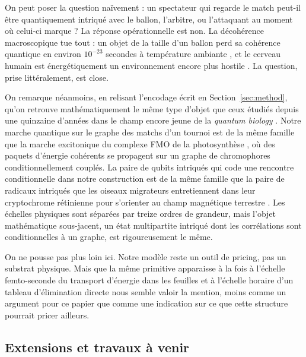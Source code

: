 \documentclass[11pt]{article}
\begin{document}
On peut poser la question naïvement : un spectateur qui regarde le
match peut-il être quantiquement intriqué avec le ballon, l'arbitre,
ou l'attaquant au moment où celui-ci marque ? La réponse opérationnelle
est non. La décohérence macroscopique tue tout : un objet de la taille
d'un ballon perd sa cohérence quantique en environ $10^{-23}$ secondes
à température ambiante \cite{joos_zeh_1985}, et le cerveau humain est
énergétiquement un environnement encore plus hostile
\cite{tegmark_2000}. La question, prise littéralement, est close.

On remarque néanmoins, en relisant l'encodage écrit en
Section~\ref{sec:method}, qu'on retrouve mathématiquement le même type
d'objet que ceux étudiés depuis une quinzaine d'années dans le champ
encore jeune de la \emph{quantum biology} \cite{lambert2013quantum}.
Notre marche quantique sur le graphe des matchs d'un tournoi est de
la même famille que la marche excitonique du complexe FMO de la
photosynthèse \cite{engel_2007, plenio2008dephasing}, où des paquets
d'énergie cohérents se propagent sur un graphe de chromophores
conditionnellement couplés. La paire de qubits intriqués qui code une
rencontre conditionnelle dans notre construction est de la même
famille que la paire de radicaux intriqués que les oiseaux migrateurs
entretiennent dans leur cryptochrome rétinienne pour s'orienter au
champ magnétique terrestre \cite{hore_mouritsen_2016}. Les échelles
physiques sont séparées par treize ordres de grandeur, mais l'objet
mathématique sous-jacent, un état multipartite intriqué dont les
corrélations sont conditionnelles à un graphe, est rigoureusement le
même.

On ne pousse pas plus loin ici. Notre modèle reste un outil de
pricing, pas un substrat physique. Mais que la même primitive
apparaisse à la fois à l'échelle femto-seconde du transport d'énergie
dans les feuilles et à l'échelle horaire d'un tableau d'élimination
directe nous semble valoir la mention, moins comme un argument pour
ce papier que comme une indication sur ce que cette structure pourrait
pricer ailleurs.

\subsection{Extensions et travaux à venir}
\end{document}
